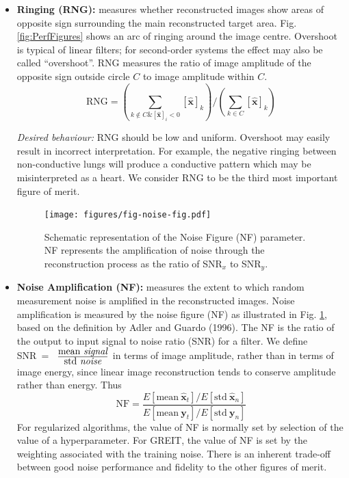 \documentclass[12pt]{iopart}
\newcommand{\xH}{\mbox{$\mathbf{\hat x}$}}
\newcommand{\yB}{\mbox{$\mathbf{y}$}}
\begin{document}
\begin{itemize}
\hspace{5mm}
{\em Desired behaviour:}
SD should be low and uniform. Large SD may result in
incorrect interpretation of images, although this
effect is less important than other artefacts. We 
consider SD to be the fifth most important figure 
of merit.

\item
{\bf Ringing (RNG):}
measures whether reconstructed images show
areas of opposite sign surrounding the main 
reconstructed target area. Fig. \ref{fig:PerfFigures}
shows an arc of ringing around the image centre.
Overshoot is typical of linear filters; for second-order
systems the effect may also be called ``overshoot''.
RNG measures the ratio of image amplitude of
the opposite sign outside circle $C$ to image
amplitude within $C$.
\begin{equation}
\mathrm{RNG} =
\left(
        \sum_{k\not\in C \& [\xH]_i < 0} [\xH]_k 
\right)
/ 
\left(
        \sum_{k\in C}                    [\xH]_k 
\right)
\end{equation}

\hspace{5mm}
{\em Desired behaviour:}
RNG should be low and uniform. Overshoot may
easily result in incorrect interpretation. For
example, the negative ringing between non-conductive
lungs will produce a conductive pattern which 
may be misinterpreted as a heart.
We consider RNG to be the third most important figure 
of merit.

\begin{figure}[bhtp]
\begin{center}
\texttt{[image: figures/fig-noise-fig.pdf]}
\caption{ \label{fig:noise_fig}
Schematic representation of the Noise Figure (NF)
parameter. NF represents the amplification of noise through
the reconstruction process as the ratio of SNR$_x$ to SNR$_y$.
}
\end{center}
\end{figure}

\item
{\bf Noise Amplification (NF):}
measures the extent to which random
measurement noise is amplified
in the reconstructed images. Noise amplification
is measured by the noise figure (NF) as
illustrated in Fig. \ref{fig:noise_fig}, 
based on the definition by Adler and Guardo (1996).
The NF is the ratio of the output to input
 signal to noise ratio (SNR) for a filter.
We define SNR~=~%
$\frac{
   \mbox{mean \em signal}
      }{
   \mbox{std \em noise}
     }
$ 
in terms of image amplitude,
rather than in terms of image energy, since linear
image reconstruction tends to conserve  amplitude
rather than energy. Thus
\begin{equation}
\mathrm{NF} = \frac{
   E[ \mathrm{mean}~\xH_t ] 
         /
   E[ \mathrm{std}~\xH_n ]
}{
   E[ \mathrm{mean}~\yB_t ] 
         /
   E[ \mathrm{std}~\yB_n ]
}
\end{equation}
For regularized algorithms, the value of NF is normally
set by selection of the value of 
a hyperparameter. For GREIT, the value of NF is set by the weighting
associated with the training noise. There is an inherent
trade-off between good noise performance and fidelity to
the other figures of merit.


\end{itemize}
\end{document}
